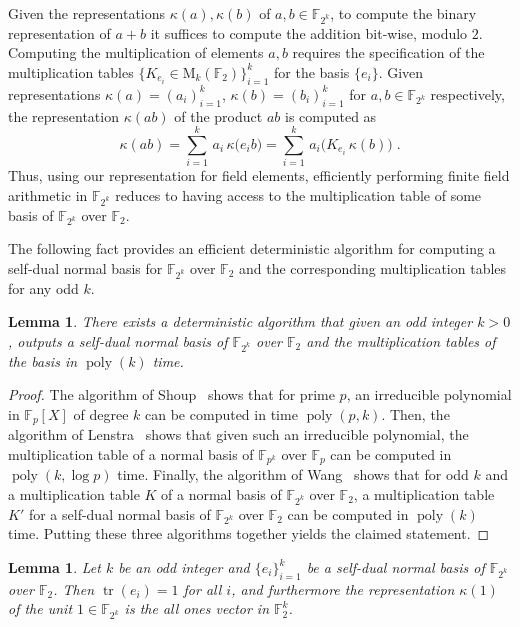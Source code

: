 \documentclass[11pt]{article}
\newtheorem{lemma}[theorem]{Lemma}
\theoremstyle{definition}
\newcommand{\F}{\ensuremath{\mathbb{F}}}
\newcommand{\Fp}{\F_p}
\newcommand{\downsize}{\kappa}
\DeclareMathOperator{\poly}{poly}
\DeclareMathOperator{\tr}{tr}
\newcommand{\Matrix}{\mathrm{M}}
\begin{document}
Given the representations $\downsize(a), \downsize(b)$ of $a, b \in \F_{2^k}$, to
compute the binary representation of $a+b$ it suffices to compute the addition
bit-wise, modulo $2$.
Computing the multiplication of elements $a, b$ requires the specification of
the multiplication tables $\{K_{e_i} \in \Matrix_k (\F_2)\}_{i=1}^k $ for the
basis $\{e_i\}$.
Given representations $\downsize(a) = (a_i)_{i=1}^k$, $\downsize(b) =
(b_i)_{i=1}^k$ for $a, b \in \F_{2^k}$ respectively, the representation
$\downsize(ab)$ of the product $ab$ is computed as
\begin{equation}
  \label{eq:eq-mult}
  \downsize(ab) = \sum_{i=1}^k \, a_i \, \downsize \bigl( e_i b \bigr) =
  \sum_{i=1}^k \, a_i \bigl( K_{e_i}\, \downsize (b) \bigr)\;.
\end{equation}
Thus, using our representation for field elements, efficiently performing finite
field arithmetic in $\F_{2^k}$ reduces to having access to the multiplication
table of some basis of $\F_{2^k}$ over $\F_2$.

The following fact provides an efficient deterministic algorithm for computing a
self-dual normal basis for $\F_{2^k}$ over $\F_2$ and the corresponding
multiplication tables for any odd $k$.

\begin{lemma}
  \label{lem:efficient_basis}
  There exists a deterministic algorithm that given an odd integer $k > 0$,
  outputs a self-dual normal basis of $\F_{2^k}$ over $\F_2$ and the
  multiplication tables of the basis in $\poly(k)$ time.
\end{lemma}

\begin{proof}
	The algorithm of Shoup~\cite[Theorem 3.2]{shoup1990new} shows that for prime
  $p$, an irreducible polynomial in $\Fp[X]$ of degree $k$ can be computed in
  time $\poly(p, k)$.
  Then, the algorithm of Lenstra~\cite[Theorem 1.1]{lenstra1991finding} shows
  that given such an irreducible polynomial, the multiplication table of a
  normal basis of $\F_{p^k}$ over $\Fp$ can be computed in $\poly(k,\log p)$
  time.
  Finally, the algorithm of Wang~\cite{wang1989algorithm} shows that for odd $k$
  and a multiplication table $K$ of a normal basis of $\F_{2^k}$ over $\F_2$, a
  multiplication table $K'$ for a self-dual normal basis of $\F_{2^k}$ over
  $\F_2$ can be computed in $\poly(k)$ time.
  Putting these three algorithms together yields the claimed statement.
\end{proof}

\begin{lemma}
  \label{lem:one}
  Let $k$ be an odd integer and $\{e_i\}_{i=1}^k$ be a self-dual normal basis of
  $\F_{2^k}$ over $\F_2$.
  Then $\tr(e_i) = 1$ for all $i$, and furthermore the representation
  $\downsize(1)$ of the unit $1 \in \F_{2^k}$ is the all ones vector in
  $\F_2^k$.
\end{lemma}
\end{document}
